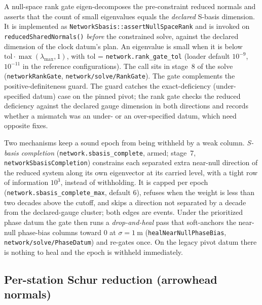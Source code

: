 \documentclass[main.tex]{subfiles}
\begin{document}
A null-space rank gate eigen-decomposes the pre-constraint reduced
normals and asserts that the count of small eigenvalues equals the
\emph{declared} S-basis dimension. It is implemented as
\texttt{NetworkSbasis::assertNullSpaceRank} and is invoked on
\texttt{reducedSharedNormals()} \emph{before} the constrained solve,
against the declared dimension of the clock datum's plan. An eigenvalue
is small when it is below $\mathrm{tol}\cdot\max(\lambda_{\max},1)$, with
$\mathrm{tol}$ = \texttt{network.rank\_gate\_tol} (loader default
$10^{-9}$, $10^{-11}$ in the reference configurations). The call sits in
stage~8 of the solve (\texttt{networkRankGate},
\texttt{network/solve/RankGate}). The gate complements the
positive-definiteness guard. The guard catches the exact-deficiency
(under-specified datum) case on the pinned pivot; the rank gate checks
the reduced deficiency against the declared gauge dimension in both
directions and records whether a mismatch was an under- or an
over-specified datum, which need opposite fixes.

Two mechanisms keep a sound epoch from being withheld by a weak column.
\emph{S-basis completion} (\texttt{network.sbasis\_complete}, armed;
stage~7, \texttt{networkSbasisCompletion}) constrains each separated
extra near-null direction of the reduced system along its own
eigenvector at its carried level, with a tight row of information
$10^{3}$, instead of withholding. It is capped per epoch
(\texttt{network.sbasis\_complete\_max}, default $6$), refuses when the
weight is less than two decades above the cutoff, and skips a direction
not separated by a decade from the declared-gauge cluster; both edges are
events. Under the prioritized phase datum the gate then runs a
\emph{drop-and-heal} pass that soft-anchors the near-null phase-bias
columns toward $0$ at $\sigma = \SI{1}{\metre}$ (\texttt{healNearNullPhaseBias},
\texttt{network/solve/PhaseDatum}) and re-gates once. On the legacy pivot
datum there is nothing to heal and the epoch is withheld immediately.

\subsection{Per-station Schur reduction (arrowhead normals)}
\label{sec:net-schur}
\end{document}
